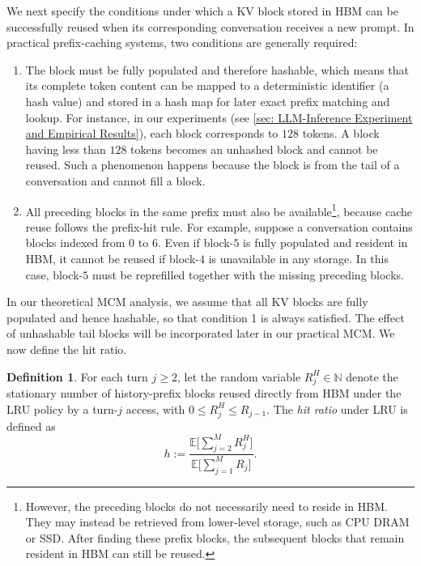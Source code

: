 \documentclass{article}
\theoremstyle{definition}
\newtheorem{definition}[definition]{Definition}
\newcommand{\E}{\mathbb E}
\newcommand{\N}{\mathbb N}
\begin{document}
We next specify the conditions under which a KV block stored in HBM can be successfully reused when its corresponding conversation receives a new prompt. In practical prefix-caching systems, two conditions are generally required:
\begin{enumerate}
    \item The block must be fully populated and therefore hashable, which means that its complete token content can be mapped to a deterministic identifier (a hash value) and stored in a hash map for later exact prefix matching and lookup. For instance, in our experiments (see \cref{sec: LLM-Inference Experiment and Empirical Results}), each block corresponds to $128$ tokens. A block having less than $128$ tokens becomes an unhashed block and cannot be reused. Such a phenomenon happens because the block is from the tail of a conversation and cannot fill a block.
    \item All preceding blocks in the same prefix must also be available\footnote{However, the preceding blocks do not necessarily need to reside in HBM. They may instead be retrieved from lower-level storage, such as CPU DRAM or SSD. After finding these prefix blocks, the subsequent blocks that remain resident in HBM can still be reused.}, because cache reuse follows the prefix-hit rule. For example, suppose a conversation contains blocks indexed from $0$ to $6$. Even if block-$5$ is fully populated and resident in HBM, it cannot be reused if block-$4$ is unavailable in any storage. In this case, block-$5$ must be reprefilled together with the missing preceding blocks.
\end{enumerate}


In our theoretical MCM analysis, we assume that all KV blocks are fully populated and hence hashable, so that condition 1 is always satisfied. The effect of unhashable tail blocks will be incorporated later in our practical MCM. We now define the hit ratio.


\begin{definition}
    \label{def:  hit ratio}
    For each turn $j\geq 2$, let the random variable $R^H_j \in \N$  denote the stationary number of history-prefix blocks reused directly from HBM under the LRU policy by a turn-$j$ access, with $0\leq R^H_j \leq R_{j-1}$. The \emph{hit ratio} under LRU is defined as
    \begin{equation}
    \label{equ:  hr}
        h :=\frac{\E \Big[\sum\limits_{j=2}^{M}R^H_{j} \Big]}{\E \Big[\sum\limits_{j=1}^{M} R_j\Big]}.
    \end{equation}
\end{definition}
\end{document}
